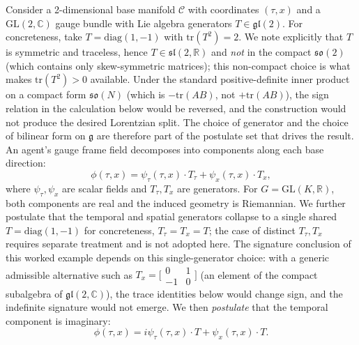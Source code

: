 \documentclass[11pt]{article}
\begin{document}
Consider a 2-dimensional base manifold $\mathcal{C}$ with coordinates $(\tau, x)$ and a $\mathrm{GL}(2, \mathbb{C})$ gauge bundle with Lie algebra generators $T \in \mathfrak{gl}(2)$. For concreteness, take $T = \mathrm{diag}(1, -1)$ with $\mathrm{tr}(T^2) = 2$. We note explicitly that $T$ is symmetric and traceless, hence $T \in \mathfrak{sl}(2, \mathbb{R})$ and \emph{not} in the compact $\mathfrak{so}(2)$ (which contains only skew-symmetric matrices); this non-compact choice is what makes $\mathrm{tr}(T^2) > 0$ available. Under the standard positive-definite inner product on a compact form $\mathfrak{so}(N)$ (which is $-\mathrm{tr}(AB)$, not $+\mathrm{tr}(AB)$), the sign relation in the calculation below would be reversed, and the construction would not produce the desired Lorentzian split. The choice of generator and the choice of bilinear form on $\mathfrak{g}$ are therefore part of the postulate set that drives the result. An agent's gauge frame field decomposes into components along each base direction:
\begin{equation}
\phi(\tau, x) = \psi_\tau(\tau, x) \cdot T_\tau + \psi_x(\tau, x) \cdot T_x,
\end{equation}
where $\psi_\tau, \psi_x$ are scalar fields and $T_\tau, T_x$ are generators. For $G = \mathrm{GL}(K, \mathbb{R})$, both components are real and the induced geometry is Riemannian. We further postulate that the temporal and spatial generators collapse to a single shared $T = \mathrm{diag}(1, -1)$ for concreteness, $T_\tau = T_x = T$; the case of distinct $T_\tau, T_x$ requires separate treatment and is not adopted here. The signature conclusion of this worked example depends on this single-generator choice: with a generic admissible alternative such as $T_x = \bigl[\begin{smallmatrix} 0 & 1 \\ -1 & 0 \end{smallmatrix}\bigr]$ (an element of the compact subalgebra of $\mathfrak{gl}(2, \mathbb{C})$), the trace identities below would change sign, and the indefinite signature would not emerge. We then \emph{postulate} that the temporal component is imaginary:
\begin{equation}
\phi(\tau, x) = i\psi_\tau(\tau, x) \cdot T + \psi_x(\tau, x) \cdot T.
\label{eq:complex_gauge_frame}
\end{equation}
\end{document}
